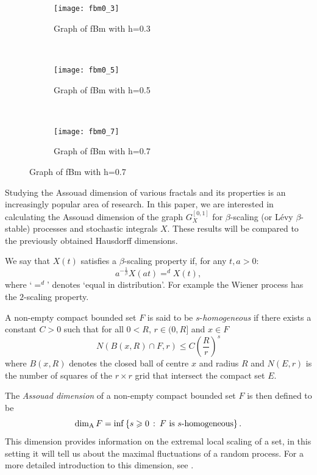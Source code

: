 \begin{figure}[h]
	\centering
	\begin{subfigure}[b]{0.3\textwidth}
		\texttt{[image: fbm0\_3]}
		\caption{Graph of fBm with h=0.3}
		\label{fig:fbm3}
	\end{subfigure}
	~ %
	\begin{subfigure}[b]{0.3\textwidth}
		\texttt{[image: fbm0\_5]}
		\caption{Graph of fBm with h=0.5}
		\label{fig:fbm5}
	\end{subfigure}
	~ %
	\begin{subfigure}[b]{0.3\textwidth}
		\texttt{[image: fbm0\_7]}
		\caption{Graph of fBm with h=0.7}
		\label{fig:fbm7}
	\end{subfigure}
\end{figure}



Studying the Assouad dimension of various fractals and its properties is an increasingly popular area of research. In this paper, we are interested in calculating the Assouad dimension of the graph $G_X^{[0,1]}$ for $\beta$-scaling (or L\'{e}vy $\beta$-stable) processes and stochastic integrals $X$. These results will be compared to the previously obtained Hausdorff dimensions.

We say that $X(t)$ satisfies a $\beta$-scaling property if, for any $t,a>0$:
\[
a^{-\frac{1}{\beta}}X(at)=^d X(t),
\]
where `$=^d$' denotes `equal in distribution'.
For example the Wiener process has the $2$-scaling property.

A non-empty compact bounded set $F$ is said to be $s$-\textit{homogeneous} if there exists a constant $C>0$ such that for all $0<R$, $r\in (0,R]$ and $x\in F$
\[
N(B(x,R) \cap F, r) \le C\left(\frac{R}{r}\right)^s
\]
where $B(x,R)$ denotes the closed ball of centre $x$ and radius $R$ and $N(E,r)$ is the number of squares of the $r\times r$ grid that intersect the compact set $E$. 

The \emph{Assouad dimension} of a non-empty compact bounded set $F$ is then defined to be 
\[
\dim_{\mathrm{A}} F = \inf \left\{ s \geqslant 0 \, \, \colon \, F \text{ is } s\text{-homogeneous} \right\}.
\]
This dimension provides information on the extremal local scaling of a set, in this setting it will tell us about the maximal fluctuations of a random process. For a more detailed introduction to this dimension, see \cite{Fr, Ro}. 

